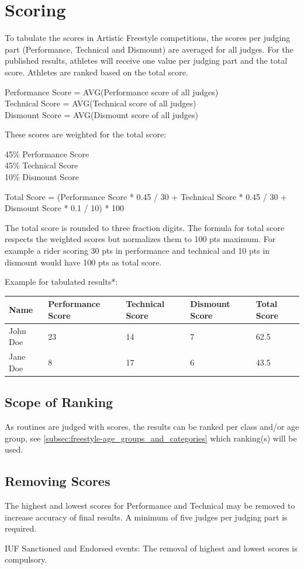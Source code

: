 \section{Scoring} \label{freestyle:sec_scoring}
To tabulate the scores in Artistic Freestyle competitions, the scores per judging part (Performance, Technical and Dismount) are averaged for all judges.
For the published results, athletes will receive one value per judging part and the total score.
Athletes are ranked based on the total score.

Performance Score = AVG(Performance score of all judges)\\
Technical Score = AVG(Technical score of all judges)\\
Dismount Score = AVG(Dismount score of all judges)

These scores are weighted for the total score:

45\% Performance Score\\
45\% Technical Score\\
10\% Dismount Score

Total Score = (Performance Score * 0.45 / 30 + Technical Score * 0.45 / 30 + Dismount Score * 0.1 / 10) * 100

The total score is rounded to three fraction digits.
The formula for total score respects the weighted scores but normalizes them to 100 pts maximum.
For example a rider scoring 30 pts in performance and technical and 10 pts in dismount would have 100 pts as total score.

Example for tabulated results*:\\
\begin{tabular}{lllll}
	\hline
	Name	&	Performance Score	&	Technical Score	&	Dismount Score	&	Total Score\\
	\hline
	John Doe	&	23	&	14	&	7	&	62.5\\
	\hline
	Jane Doe	&	8	&	17	&	6	&	43.5\\
	\hline
\end{tabular}

\subsection{Scope of Ranking}
As routines are judged with scores, the results can be ranked per class and/or age group, see \ref{subsec:freestyle-age_groups_and_categories} which ranking(s) will be used.

\subsection{Removing Scores}
The highest and lowest scores for Performance and Technical may be removed to increase accuracy of final results.
A minimum of five judges per judging part is required.

IUF Sanctioned and Endorsed events: The removal of highest and lowest scores is compulsory.